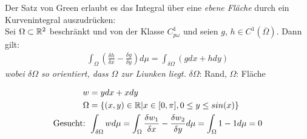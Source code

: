 \documentclass[a4paper]{article}
\begin{document}
		\begin{fsatz}
			Der Satz von Green erlaubt es das Integral über eine \emph{ebene Fläche} durch ein Kurvenintegral auszudrücken:\\
			Sei $\Omega \subset \mathbb{R}^2$ beschränkt und von der Klasse $C^1_{p \omega}$ und seien $g$, $h \in C^1 (\overline{\Omega})$. Dann gilt:
			\begin{align*}
				\int_\Omega \left( \frac{\delta h}{\delta x}- \frac{\delta g}{\delta y}\right) d \mu = \int_{\delta \Omega} \left( gdx + hdy \right) 
			\end{align*}
			\emph{wobei $\delta \Omega$ so orientiert, dass $\Omega$ zur Liunken liegt.} $\delta \Omega$: Rand, $\Omega$: Fläche
		\end{fsatz}

		\begin{fdef}
			\begin{align*}
				w &= ydx + xdy\\
				\Omega &= \{(x,y) \in \mathbb{R} |  x \in [0, \pi], 0 \leq y \leq sin(x)\}\\
				\text{Gesucht: } &\int_{\delta \Omega} w d \mu = \int_\Omega \frac{\delta w_1}{\delta x} - \frac{\delta w_2}{\delta y} d \mu = \int_\Omega 1 -1 d \mu = 0
			\end{align*}

		\end{fdef}
\end{document}
